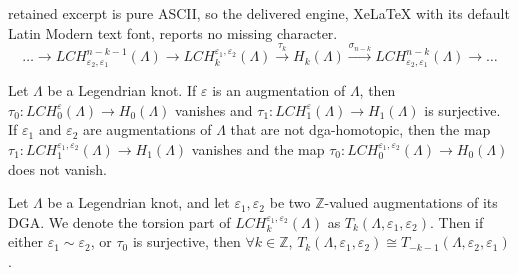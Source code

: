\documentclass[10pt,a4paper]{amsart}
\newcommand{\Z}{\ensuremath{\mathbb{Z}}}
\begin{document}
retained excerpt is pure ASCII, so the delivered engine, XeLaTeX with its default Latin Modern text font, reports no missing character.
\begin{equation} \label{eq:dualityseq-bilin}
\ldots \to LCH^{n-k-1}_{\varepsilon_2, \varepsilon_1}(\Lambda) \to LCH^{\varepsilon_1,\varepsilon_2}_k(\Lambda) 
\stackrel{\tau_k}{\longrightarrow} H_k(\Lambda) \stackrel{\sigma_{n-k}}{\longrightarrow} LCH^{n-k}_{\varepsilon_2, \varepsilon_1}
(\Lambda) \to \ldots
\end{equation}

\begin{Prop}  \label{prop:tau}
Let $\Lambda$ be a Legendrian knot. If $\varepsilon$ is an augmentation of $\Lambda$, then
$\tau_0: LCH_0^\varepsilon(\Lambda) \to H_0(\Lambda)$ vanishes and $\tau_1: LCH_1^\varepsilon(\Lambda) \to H_1(\Lambda)$
is surjective. If $\varepsilon_1$ and $\varepsilon_2$ are augmentations of $\Lambda$ that are not dga-homotopic, then the map
$\tau_1: LCH_1^{\varepsilon_1, \varepsilon_2}(\Lambda) \to H_1(\Lambda)$ vanishes and the map 
$\tau_0: LCH_0^{\varepsilon_1, \varepsilon_2}(\Lambda) \to H_0(\Lambda)$ does not vanish.
\end{Prop}

\begin{Cor}\label{cor:torsion_iso}Let $\Lambda$ be a Legendrian knot, and let $\varepsilon_1,\varepsilon_2$ be two $\Z$-valued augmentations of its DGA. We denote the torsion part of $LCH^{\varepsilon_1,\varepsilon_2}_k(\Lambda)$ as $T_k(\Lambda,\varepsilon_1,\varepsilon_2)$. Then if either $\varepsilon_1\sim\varepsilon_2$, or $\tau_0$ is surjective, then $\forall k\in\Z$, $T_k(\Lambda, \varepsilon_1,\varepsilon_2)\cong T_{-k-1}(\Lambda, \varepsilon_2,\varepsilon_1)$. 
\end{Cor}
\end{document}
